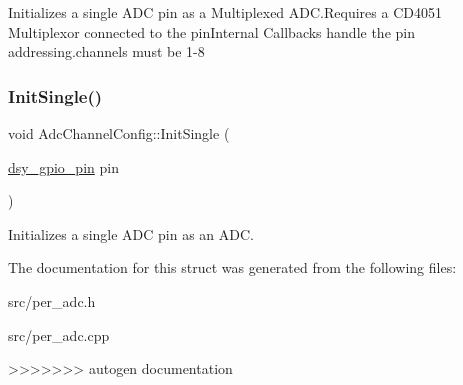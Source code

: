 Initializes a single A\+DC pin as a Multiplexed A\+D\+C.\+Requires a C\+D4051 Multiplexor connected to the pin\+Internal Callbacks handle the pin addressing.\+channels must be 1-\/8 \mbox{\label{structdaisy_1_1_adc_channel_config_a51189aad7fdee93523dfbcd333b681bf}} 
\subsubsection{\texorpdfstring{Init\+Single()}{InitSingle()}}
{\footnotesize\ttfamily void Adc\+Channel\+Config\+::\+Init\+Single (\begin{DoxyParamCaption}\item[{\hyperlink{structdsy__gpio__pin}{dsy\+\_\+gpio\+\_\+pin}}]{pin }\end{DoxyParamCaption})}

Initializes a single A\+DC pin as an A\+DC. 

The documentation for this struct was generated from the following files\+:\begin{DoxyCompactItemize}
\item 
src/per\+\_\+adc.\+h\item 
src/per\+\_\+adc.\+cpp\end{DoxyCompactItemize}
>>>>>>> autogen documentation
